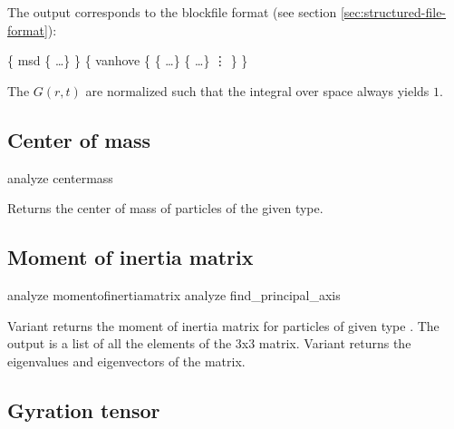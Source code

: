 The output corresponds to the blockfile format (see section
\vref{sec:structured-file-format}):
\begin{code}
\{ msd \{   \dots \} \} 
\{ vanhove \{ \{   \dots \} 
            \{   \dots \}
\vdots
          \}
\}
\end{code}

The $G(r,t)$ are normalized such that the integral over space always
yields $1$.

\subsection{Center of mass}
\label{analyze:centermass}
\begin{pysyntax}
\end{pysyntax}
\begin{essyntax}
  analyze centermass 
\end{essyntax}
Returns the center of mass of particles of the given type.

\subsection{Moment of inertia matrix}
\label{analyze:momentofinteratiamatrix}
\label{analyze:find-principal-axis}

\begin{pysyntax}
\end{pysyntax}
\begin{essyntax}
   analyze momentofinertiamatrix {  } 
   analyze find_principal_axis 
\end{essyntax}
Variant  returns the moment of inertia matrix for particles
of given type . The output is a list of all the elements
of the 3x3 matrix. Variant  returns the eigenvalues and
eigenvectors of the matrix.

\subsection{Gyration tensor}
\label{analyze:gyration-tensor}

